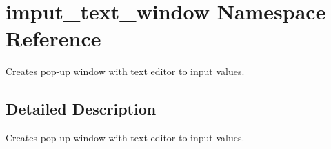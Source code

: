 \hypertarget{namespaceimput__text__window}{\section{imput\-\_\-text\-\_\-window Namespace Reference}
\label{namespaceimput__text__window}
}


Creates pop-\/up window with text editor to input values.  




\subsection{Detailed Description}
Creates pop-\/up window with text editor to input values. 